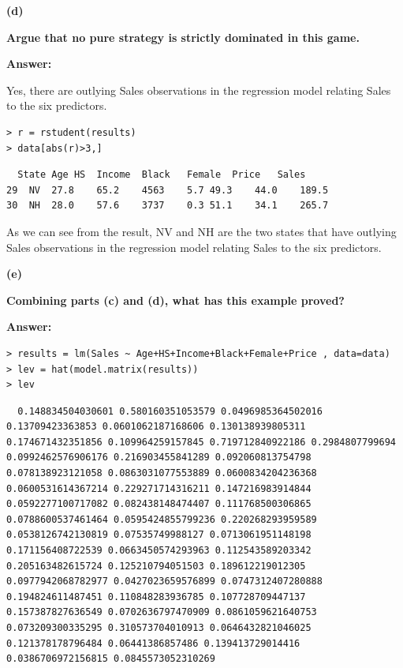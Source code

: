 \documentclass[letterpaper,11pt]{article}
\begin{document}
\begin{addmargin}[-1.1em]{0em}
\textbf{(d)}\par\end{addmargin}
  \textbf{Argue that no pure strategy is strictly dominated in this game.}\par
\bigbreak
\begin{addmargin}[-0.5em]{0em}
\textbf{Answer: }\end{addmargin}

Yes, there are outlying Sales observations in the regression model relating Sales to the six predictors.\par
\begin{lstlisting}
> r = rstudent(results)
> data[abs(r)>3,]
\end{lstlisting}

\begin{lstlisting}
  State	Age	HS	Income	Black	Female	Price	Sales
29	NV	27.8	65.2	4563	5.7	49.3	44.0	189.5
30	NH	28.0	57.6	3737	0.3	51.1	34.1	265.7
\end{lstlisting}

As we can see from the result, NV and NH are the two states that have outlying Sales observations in the regression model relating Sales to the six predictors.


\begin{addmargin}[-1.1em]{0em}
\textbf{(e)}\par\end{addmargin}
  \textbf{Combining parts (c) and (d), what has this example proved?}\par
\bigbreak
\begin{addmargin}[-0.5em]{0em}
\textbf{Answer: }\end{addmargin}


\begin{lstlisting}
> results = lm(Sales ~ Age+HS+Income+Black+Female+Price , data=data)
> lev = hat(model.matrix(results))
> lev
\end{lstlisting}

\begin{lstlisting}
  0.148834504030601 0.580160351053579 0.0496985364502016 0.13709423363853 0.0601062187168606 0.130138939805311 0.174671432351856 0.109964259157845 0.719712840922186 0.2984807799694 0.0992462576906176 0.216903455841289 0.092060813754798 0.078138923121058 0.0863031077553889 0.0600834204236368 0.0600531614367214 0.229271714316211 0.147216983914844 0.0592277100717082 0.082438148474407 0.111768500306865 0.0788600537461464 0.0595424855799236 0.220268293959589 0.0538126742130819 0.07535749988127 0.0713061951148198 0.171156408722539 0.0663450574293963 0.112543589203342 0.205163482615724 0.125210794051503 0.189612219012305 0.0977942068782977 0.0427023659576899 0.0747312407280888 0.194824611487451 0.110848283936785 0.107728709447137 0.157387827636549 0.0702636797470909 0.0861059621640753 0.073209300335295 0.310573704010913 0.0646432821046025 0.121378178796484 0.06441386857486 0.139413729014416 0.0386706972156815 0.0845573052310269
\end{lstlisting}
\end{document}
